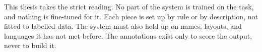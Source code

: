 This thesis takes the strict reading. No part of the system is trained on the task,
and nothing is fine-tuned for it. Each piece is set up by rule or by description,
not fitted to labelled data. The system must also hold up on names, layouts, and
languages it has not met before. The annotations exist only to score the output,
never to build it.